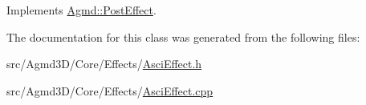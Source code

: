 Implements \hyperlink{class_agmd_1_1_post_effect_a7fa3e1ad3a588dce0f9f51db8b420c91}{Agmd\+::\+Post\+Effect}.



The documentation for this class was generated from the following files\+:\begin{DoxyCompactItemize}
\item 
src/\+Agmd3\+D/\+Core/\+Effects/\hyperlink{_asci_effect_8h}{Asci\+Effect.\+h}\item 
src/\+Agmd3\+D/\+Core/\+Effects/\hyperlink{_asci_effect_8cpp}{Asci\+Effect.\+cpp}\end{DoxyCompactItemize}
